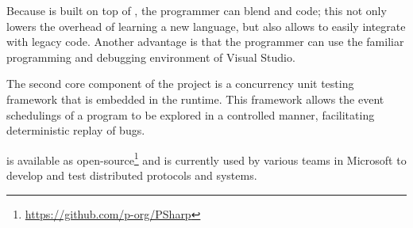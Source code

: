 Because \psharp is built on top of \csharp, the programmer can blend \psharp and \csharp code; this not only lowers the overhead of learning a new language, but also allows \psharp to easily integrate with legacy code. Another advantage is that the programmer can use the familiar programming and debugging environment of Visual Studio.

The second core component of the \psharp project is a concurrency unit testing framework that is embedded in the \psharp runtime. This framework allows the event schedulings of a \psharp program to be explored in a controlled manner, facilitating deterministic replay of bugs.

\psharp is available as open-source\footnote{\url{https://github.com/p-org/PSharp}} and is currently used by various teams in Microsoft to develop and test distributed protocols and systems.


